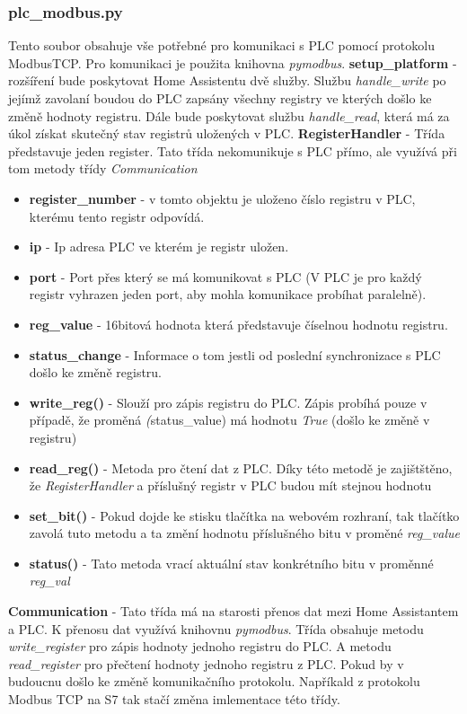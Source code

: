 \documentclass[a4paper,12pt,czech,bibliography=totoc]{scrbook}
\begin{document}
\subsubsection{plc\_modbus.py}
Tento soubor obsahuje vše potřebné pro komunikaci s PLC pomocí protokolu ModbusTCP. Pro komunikaci je použita knihovna \textit{pymodbus}. 
\newline
\textbf{setup\_platform} - rozšíření bude poskytovat Home Assistentu dvě služby. Službu \textit{handle\_write} po jejímž zavolaní boudou do PLC zapsány všechny registry ve kterých došlo ke změně hodnoty registru. Dále bude poskytovat službu \textit{handle\_read}, která má za úkol získat skutečný stav registrů uložených v PLC.
\newline
\newline
\textbf{RegisterHandler} - Třída představuje jeden register. Tato třída nekomunikuje s PLC přímo, ale využívá při tom metody třídy \textit{Communication}
  \begin{itemize}
  	\item \textbf{register\_number} - v tomto objektu je uloženo číslo registru v PLC, kterému tento registr odpovídá.
  	\item \textbf{ip} - Ip adresa PLC ve kterém je registr uložen.
  	\item \textbf{port} - Port přes který se má komunikovat s PLC (V PLC je pro každý registr vyhrazen jeden port, aby mohla komunikace probíhat paralelně).
  	\item \textbf{reg\_value }- 16bitová hodnota která představuje číselnou hodnotu registru.
  	\item \textbf{status\_change} - Informace o tom jestli od poslední synchronizace s PLC došlo ke změně registru.
  	\item \textbf{write\_reg()} - Slouží pro zápis registru do PLC. Zápis probíhá pouze v případě, že proměná \textit(status\_value) má hodnotu \textit{True} (došlo ke změně v registru)
  	\item  \textbf{read\_reg()} - Metoda pro čtení dat z PLC. Díky této metodě je zajištštěno, že \textit{RegisterHandler} a příslušný registr v PLC budou mít stejnou hodnotu
  	\item \textbf{set\_bit()} - Pokud dojde ke stisku tlačítka na webovém rozhraní, tak tlačítko zavolá tuto metodu a ta změní hodnotu příslušného bitu v proměné \textit{reg\_value}
  	\item \textbf{status()} - Tato metoda vrací aktuální stav konkrétního bitu v proměnné \textit{reg\_val} 
  \end{itemize}
\textbf{Communication} - Tato třída má na starosti přenos dat mezi Home Assistantem a PLC. K přenosu dat využívá knihovnu \textit{pymodbus}. Třída obsahuje metodu \textit{write\_register} pro zápis hodnoty jednoho registru do PLC. A metodu \textit{read\_register} pro přečtení hodnoty jednoho registru z PLC. Pokud by v budoucnu došlo ke změně komunikačního protokolu. Napříkald z protokolu Modbus TCP na S7 tak stačí změna imlementace této třídy.
\end{document}
